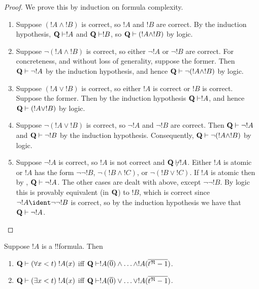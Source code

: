 \documentclass[../../../include/open-logic-section]{subfiles}
\begin{document}
\begin{proof}
We prove this by induction on formula complexity.
%
\begin{enumerate}
\item Suppose $(!A \land !B)$ is correct, so $!A$ and $!B$
are correct. By the induction hypothesis, $\Th{Q} \Proves !A$
and $\Th{Q} \Proves !B$, so $\Th{Q} \Proves (!A \land !B)$
by logic.
%
\item Suppose $\lnot(!A \land !B)$ is correct, so either
$\lnot !A$ or $\lnot !B$ are correct. For concreteness, and
without loss of generality, suppose the former. Then
$\Th{Q} \Proves \lnot !A$ by the induction hypothesis, and
hence $\Th{Q} \Proves \lnot(!A \land !B)$ by logic.
%
\item Suppose $(!A \lor !B)$ is correct, so either
$!A$ is correct or $!B$ is correct. Suppose the former.
Then by the induction hypothesis $\Th{Q} \Proves !A$, and
hence $\Th{Q} \Proves (!A \lor !B)$ by logic.
%
\item Suppose $\lnot(!A \lor !B)$ is correct, so $\lnot !A$
and $\lnot !B$ are correct. Then $\Th{Q} \Proves \lnot !A$
and $\Th{Q} \Proves \lnot !B$ by the induction hypothesis.
Consequently, $\Th{Q} \Proves \lnot(!A \land !B)$ by logic.
%
\item Suppose $\lnot !A$ is correct, so $!A$ is not correct
and $\Th{Q} \not\Proves !A$. Either $!A$ is atomic or $!A$
has the form $\lnot\lnot !B$, $\lnot(!B \land !C)$, or
$\lnot(!B \lor !C)$. If $!A$ is atomic then by
, $\Th{Q} \Proves \lnot !A$.
The other cases are dealt with above, except $\lnot\lnot !B$.
By logic this is provably equivalent (in $\mathbf{Q}$) to $!B$,
which is correct since $\lnot !A \ident \lnot\lnot !B$ is
correct, so by the induction hypothesis we have that
$\Th{Q} \Proves \lnot !A$.
\end{enumerate}
\end{proof}

\begin{lem}
Suppose $!A$ is a !!{formula}. Then
\begin{enumerate}
\item $\Th{Q} \Proves \bforall{x<t}{!A(x)}$ iff $\Th{Q} \Proves
    !A(\num 0) \land \dotsc \land !A(\num{t^\Struct{N}-1})$.
\item $\Th{Q} \Proves \bexists{x<t}{!A(x)}$ iff $\Th{Q} \Proves
    !A(\num 0) \lor \dotsc \lor !A(\num{t^\Struct{N}-1})$.
\end{enumerate}
\end{lem}
\end{document}
